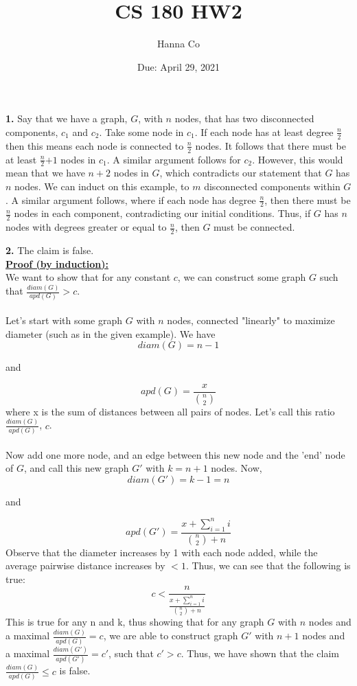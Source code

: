 \documentclass[10pt, letterpaper]{report}
\title{CS 180 HW2}
\author{Hanna Co}
\date{Due: April 29, 2021}
\begin{document}
\maketitle
\noindent \large{\textbf{1.} } Say that we have a graph, $G$, with $n$ nodes, that has two disconnected components, $c_1$ and $c_2$. Take some node in $c_1$. If each node has at least degree \(\frac{n}{2}\) then this means each node is connected to \(\frac{n}{2}\)  nodes. It follows that there must be at least \(\frac{n}{2}\)$+ 1$ nodes in $c_1$. A similar argument follows for $c_2$. However, this would mean that we have $n+2$ nodes in $G$, which contradicts our statement that $G$ has $n$ nodes. We can induct on this example, to $m$ disconnected components within $G$. A similar argument follows, where if each node has degree \(\frac{n}{2}\), then there must be \(\frac{n}{2}\) nodes in each component, contradicting our initial conditions. Thus, if $G$ has $n$ nodes with degrees greater or equal to \(\frac{n}{2}\), then $G$ must be connected.

\newpage
\noindent \large{\textbf{2.} } The claim is false.\\
\textbf{\underline{Proof (by induction):}}\\
We want to show that for any constant $c$, we can construct some graph $G$ such that \(\frac{diam(G)}{apd(G)} > c\). \\
\\
Let's start with some graph $G$ with $n$ nodes, connected "linearly" to maximize diameter (such as in the given example). We have 
\[diam(G) = n - 1\] 
\centerline{and}
\[apd(G) = \frac{x}{{n \choose 2}}\] 
where x is the sum of distances between all pairs of nodes. Let's call this ratio \(\frac{diam(G)}{apd(G)}\),  $c$.\\
\\
Now add one more node, and an edge between this new node and the 'end' node of $G$,  and call this new graph $G'$ with $k = n + 1$ nodes. Now, 
\[diam(G') = k - 1 = n\] 
\centerline{and} 
\[ apd(G') = \frac{x + \sum_{i=1}^{n} i}{{n \choose 2} + n} \] 
Observe that the diameter increases by 1 with each node added, while the average pairwise distance increases by $<1$. Thus, we can see that the following is true: \[c < {\frac{n}{\frac{x + \sum_{i=1}^{n} i}{{n \choose 2} + n}}}\] 
This is true for any n and k, thus showing that for any graph $G$ with $n$ nodes and a maximal \(\frac{diam(G)}{apd(G)} = c\), we are able to construct graph $G'$ with $n + 1$ nodes and a maximal \(\frac{diam(G')}{apd(G')} = c'\), such that \(c' > c\). Thus, we have shown that the claim \(\frac{diam(G)}{apd(G)} \leq c\) is false.
\end{document}

